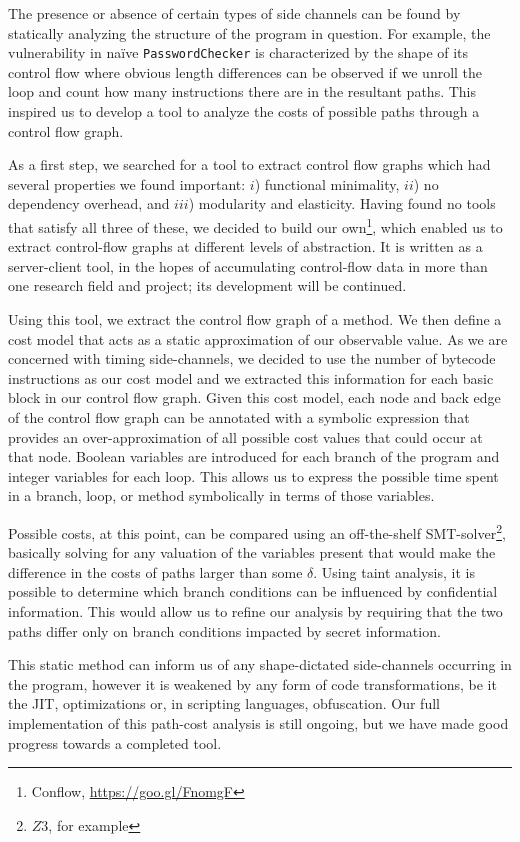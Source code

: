 The presence or absence of certain types of side channels can be found by 
statically analyzing the structure of the program in question. For example, the vulnerability in na\"ive \texttt{PasswordChecker} is characterized by the shape of its control flow where obvious length
differences can be observed if we unroll the loop and count how many instructions there are in the resultant
paths. This inspired us to develop a tool to analyze the costs of possible paths through a control flow graph. 

As a first step, we searched for a tool to extract control flow graphs which had several properties we found important: $i$) functional minimality, $ii$) no dependency overhead, and $iii$) modularity and elasticity. Having found no tools that satisfy all three of these, we decided to build our own\footnote{Conflow, \href{https://goo.gl/FnomgF}{https://goo.gl/FnomgF}}, which enabled us to extract control-flow graphs at different levels of abstraction. It is written as a server-client tool, in the hopes of accumulating control-flow data in more than one research field and project; its development will be continued.

Using this tool, we extract the control flow graph of a method. We then define a cost model that acts as a static approximation of our observable value. As we are concerned with timing side-channels, we decided to use the number of bytecode instructions as our cost model and we extracted this information for each basic block in our control flow graph. Given this cost model, each node and back edge of the control flow graph can be annotated with a symbolic expression that provides an over-approximation of all possible cost values that could occur at that node. Boolean variables are introduced for each branch of the program and integer variables for each loop. This allows us to express the possible time spent in a branch, loop, or method symbolically in terms of those variables. 

Possible costs, at this point, can be compared using an off-the-shelf SMT-solver\footnote{$Z3$, for example}, basically solving for any valuation of the variables present that would make the difference in the costs of paths larger than some $\delta$. Using taint analysis, it is possible to determine which branch conditions can be influenced by confidential information. This would allow us to refine our analysis by requiring that the two paths differ only on branch conditions impacted by secret information. 

This static method can inform us of any shape-dictated side-channels occurring in the program, however it is weakened by any form of code transformations, be it the JIT, optimizations or, in scripting languages, obfuscation. Our full implementation of this path-cost analysis is still ongoing, but we have made good progress towards a completed tool. 
